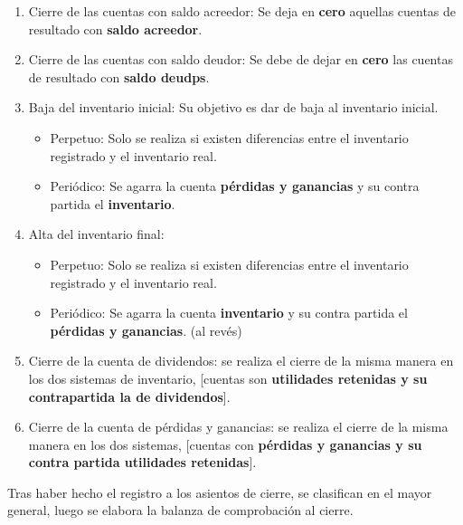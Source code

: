 \documentclass{article}
\begin{document}
\begin{enumerate}
    \item Cierre de las cuentas con saldo acreedor: Se deja en \textbf{cero} aquellas cuentas de resultado con \textbf{saldo acreedor}.
    \item Cierre de las cuentas con saldo deudor: Se debe de dejar en \textbf{cero} las cuentas de resultado con \textbf{saldo deudps}.
    \item Baja del inventario inicial: Su objetivo es dar de baja al inventario inicial.
    \begin{itemize}
        \item Perpetuo: Solo se realiza si existen diferencias entre el inventario registrado y el inventario real.
        \item Periódico: Se agarra la cuenta \textbf{pérdidas y ganancias} y su contra partida el \textbf{inventario}.
    \end{itemize}
    
    \item Alta del inventario final: 
    \begin{itemize}
        \item Perpetuo: Solo se realiza si existen diferencias entre el inventario registrado y el inventario real.
        \item Periódico: Se agarra la cuenta \textbf{inventario} y su contra partida el \textbf{pérdidas y ganancias}. (al revés)
    \end{itemize}

    
    \item Cierre de la cuenta de dividendos: se realiza el cierre de la misma manera en los dos sistemas de inventario, [cuentas son \textbf{utilidades retenidas y su contrapartida la de dividendos}].

    
    \item Cierre de la cuenta de pérdidas y ganancias: se realiza el cierre de la misma manera en los dos sistemas, [cuentas con \textbf{pérdidas y ganancias  y su contra partida utilidades retenidas}].
\end{enumerate} 

Tras haber hecho el registro a los asientos de cierre, se clasifican en el mayor general, luego se elabora la balanza de comprobación al cierre.
\end{document}
